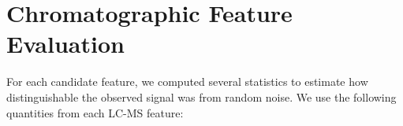 \documentclass{article}
\begin{document}
\newcommand{\monosaccharide}[1]{{\bf #1}}
\newcommand{\nglycan}[0]{\textit{N}-glycan }
\newcommand{\nglycans}[0]{\textit{N}-glycans }

\newcommand{\msn}[0]{$MS^n$}
\newcommand{\ms}[1]{$MS^#1$}

\newcommand{\agp}[0]{\textit{20150930-06-AGP} }
\newcommand{\phil}[0]{\textit{20141031-07-Phil-82} }
\newcommand{\philbs}[0]{\textit{20141101-04-Phil-BS} }
\newcommand{\igg}[0]{\textit{20151002-02-IGG} }
\newcommand{\dpphil}[0]{\textit{20141128-11-Phil-82} }
\newcommand{\dpagp}[0]{\textit{AGP-DR-Perm-glycans-1} }
\newcommand{\rpagp}[0]{\textit{AGP-permethylated-2ul-inj-55-SLens} }
\newcommand{\rphumanserum}[0]{\textit{Perm-BS-070111-04-Human-Serum} }


\section{Chromatographic Feature Evaluation}\label{sec:feature_evaluation}
    For each candidate feature, we computed several statistics to estimate how distinguishable
    the observed signal was from random noise. We use the following quantities from each LC-MS
    feature:
\end{document}
